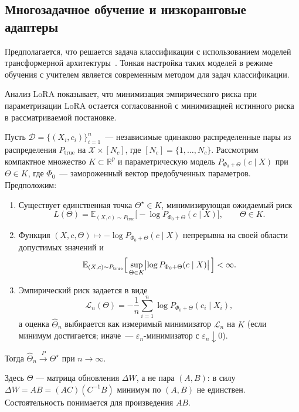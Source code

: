 \subsection{Многозадачное обучение и низкоранговые адаптеры}

Предполагается, что решается задача классификации с использованием моделей трансформерной архитектуры~\cite{attention}.
Тонкая настройка таких моделей в режиме обучения с учителем является современным методом для задач классификации.

Анализ LoRA показывает, что минимизация эмпирического риска при параметризации LoRA остается согласованной с минимизацией истинного риска в рассматриваемой постановке.

\begin{theorem}\label{theorem:consistency}
Пусть $\mathcal{D} = \{(X_i, c_i)\}_{i=1}^n$~--- независимые одинаково распределенные пары из распределения $P_{\mathrm{true}}$ на $\mathcal{X}\times [N_c]$, где $[N_c]=\{1,\ldots,N_c\}$.
Рассмотрим компактное множество $K\subset\mathbb{R}^p$ и параметрическую модель $P_{\Phi_0+\Theta}(c\mid X)$ при $\Theta\in K$, где $\Phi_0$~--- замороженный вектор предобученных параметров.
Предположим:
\begin{enumerate}
    \item Существует единственная точка $\Theta^\star \in K$, минимизирующая ожидаемый риск
    \[
        L(\Theta) = \mathbb{E}_{(X,c)\sim P_{\mathrm{true}}}\bigl[-\log P_{\Phi_0+\Theta}(c\mid X)\bigr],\qquad \Theta\in K.
    \]
    \item Функция $(X,c,\Theta)\mapsto -\log P_{\Phi_0+\Theta}(c\mid X)$ непрерывна на своей области допустимых значений и
    \[
        \mathbb{E}_{(X,c)\sim P_{\mathrm{true}}}\Bigl[\,\sup_{\Theta\in K}\bigl|\log P_{\Phi_0+\Theta}(c\mid X)\bigr|\,\Bigr] < \infty.
    \]
    \item Эмпирический риск задается в виде
    \begin{equation}
    \label{eq:loss}
        \mathscr{L}_n(\Theta) = -\frac{1}{n} \sum_{i=1}^n \log P_{\Phi_0+\Theta}(c_i\mid X_i),
    \end{equation}
    а оценка $\widehat{\Theta}_n$ выбирается как измеримый минимизатор $\mathscr{L}_n$ на $K$ (если минимум достигается; иначе~--- $\varepsilon_n$-минимизатор с $\varepsilon_n\downarrow 0$).
\end{enumerate}
Тогда $\widehat{\Theta}_n \xrightarrow{P} \Theta^\star$ при $n\to\infty$.
\end{theorem}
\begin{remark}
Здесь $\Theta$ --- матрица обновления $\Delta W$, а не пара $(A,B)$: в силу $\Delta W=AB=(AC)(C^{-1}B)$ минимум по $(A,B)$ не единствен. Состоятельность понимается для произведения $AB$.
\end{remark}
